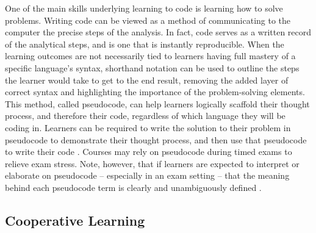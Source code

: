 One of the main skills underlying learning to code is learning how to solve problems. 
Writing code can be viewed as a method of communicating to the computer the precise steps of the analysis.
In fact, code serves as a written record of the analytical steps, and is one that is instantly reproducible.
When the learning outcomes are not necessarily tied to learners having full mastery of a specific language's syntax, shorthand notation can be used to outline the steps the learner would take to get to the end result, removing the added layer of correct syntax and highlighting the importance of the problem-solving elements.
This method, called pseudocode, can help learners logically scaffold their thought process, and therefore their code, regardless of which language they will be coding in.
Learners can be required to write the solution to their problem in pseudocode to demonstrate their thought process, and then use that pseudocode to write their code \citep[e.g.,][]{olsen_using_2005}.
Courses may rely on pseudocode during timed exams to relieve exam stress.
Note, however, that if learners are expected to interpret or elaborate on pseudocode -- especially in an exam setting -- that the 
meaning behind each pseudocode term is clearly and unambiguously defined \citep{cutts_code_2014}.

\subsection{Cooperative Learning} 

